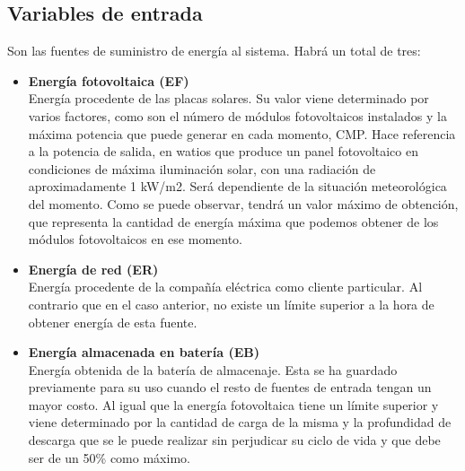 \subsection{Variables de entrada}
Son las fuentes de suministro de energía al sistema. Habrá un total de tres:
\begin{itemize}
	\item \textbf{Energía fotovoltaica (EF)}\\ Energía procedente de las placas solares. Su valor viene determinado por varios factores, como son el número de módulos fotovoltaicos instalados y la máxima potencia que puede generar en cada momento, \gls{CMP}. Hace referencia a la potencia de salida, en watios que produce un panel fotovoltaico en condiciones de máxima iluminación solar, con una radiación de aproximadamente 1 kW/m2. Será dependiente de la situación meteorológica del momento. Como se puede observar, tendrá un valor máximo de obtención, que representa la cantidad de energía máxima que podemos obtener de los módulos fotovoltaicos en ese momento.
	\item \textbf{Energía de red (ER)}\\ Energía procedente de la compañía eléctrica como cliente particular. Al contrario que en el caso anterior, no existe un límite superior a la hora de obtener energía de esta fuente.
	\item \textbf{Energía almacenada en batería (EB)}\\ Energía obtenida de la batería de almacenaje. Esta se ha guardado previamente para su uso cuando el resto de fuentes de entrada tengan un mayor costo. Al igual que la energía fotovoltaica tiene un límite superior y viene determinado por la cantidad de carga de la misma y la profundidad de descarga que se le puede realizar sin perjudicar su ciclo de vida y que debe ser de un 50\% como máximo.
\end{itemize}

